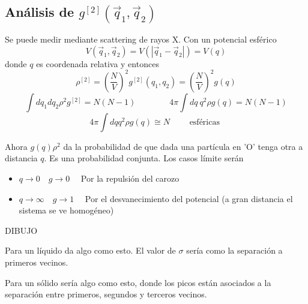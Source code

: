 \documentclass[10pt,oneside]{CBFT_book}
\begin{document}
\subsection{Análisis de $g^{[2]}(\vec{q}_1,\vec{q}_2)$}

Se puede medir mediante scattering de rayos X.
Con un potencial esférico
\[
	V(\vec{q}_1,\vec{q}_2) = V( |\vec{q}_1-\vec{q}_2| ) = V(q)
\]
donde $q$ es coordenada relativa  y entonces 
\[
	\rho^{[2]} = \left( \frac{N}{V} \right)^2 g^{[2]}( q_1, q_2 ) = 
	\left( \frac{N}{V} \right)^2 g( q )
\]
\[
	\int dq_1 dq_2 \rho^2 g^{[2]} = N(N-1) \qquad \qquad 4\pi \int dq \: q^2 \rho g(q) = N(N-1)
\]
\[
	4\pi \int dq q^2 \rho g(q) \cong N \qquad \text{ esféricas }
\]

Ahora $g(q)\rho^2$ da la probabilidad de que dada una partícula en 'O' tenga otra a distancia $q$. Es una probabilidad
conjunta.
Los casos límite serán 
\begin{itemize}
	\item $q \to 0 \quad g \to 0 \quad $ Por la repulsión del carozo
	\item $q \to \infty \quad g \to 1  \quad $ Por el desvanecimiento del potencial (a gran distancia el sistema se 
ve 	homogéneo)
\end{itemize}

DIBUJO

Para un líquido da algo como esto. El valor de $ \sigma $ sería como la separación a primeros vecinos.

Para un sólido sería algo como esto, donde los picos están asociados a la separación entre primeros, segundos y
terceros vecinos.
\end{document}
